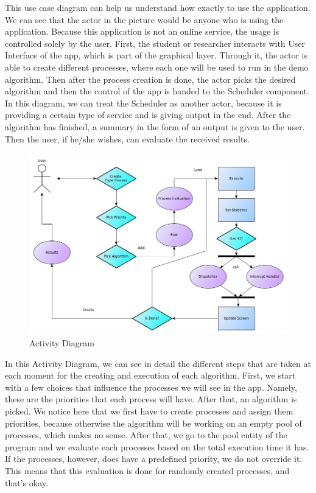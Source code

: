 \documentclass{article}
\begin{document}
This use case diagram can help us understand how exactly to use the application. We can see that the actor in the picture would be anyone who is using the application. Because this application is not an online service, the usage is controlled solely by the user. First, the student or researcher interacts with User Interface of the app, which is part of the graphical layer. Through it, the actor is able to create different processes, where each one will be used to run in the demo algorithm. Then after the process creation is done, the actor picks the desired algorithm and then the control of the app is handed to the Scheduler component. In this diagram, we can treat the Scheduler as another actor, because it is providing a certain type of service and is giving output in the end. After the algorithm has finished, a summary in the form of an output is given to the user. Then the user, if he/she wishes, can evaluate the received results.

\begin{figure}[H]
  \includegraphics[width=\linewidth]{./pics/activity.jpg}
  \caption{Activity Diagram}
  \label{fig:Activity Diagram}
\end{figure}

In this Activity Diagram, we can see in detail the different steps that are taken at each moment for the creating and execution of each algorithm. First, we start with a few choices that influence the processes we will see in the app. Namely, these are the priorities that each process will have. After that, an algorithm is picked. We notice here that we first have to create processes and assign them priorities, because otherwise the algorithm will be working on an empty pool of processes, which makes no sense. After that, we go to the pool entity of the program and we evaluate each processes based on the total execution time it has. If the processes, however, does have a predefined priority, we do not override it. This means that this evaluation is done for randomly created processes, and that's okay.
\end{document}
